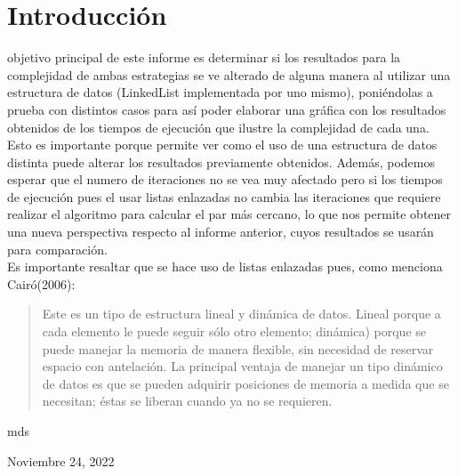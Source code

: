 \section{Introducción}
% 
% 
% 
% 
 objetivo principal de este informe es determinar si los resultados para la complejidad de ambas estrategias se ve alterado de alguna manera al utilizar una estructura de datos (LinkedList implementada por uno mismo), poniéndolas a prueba con distintos casos para así poder elaborar una gráfica con los resultados obtenidos de los tiempos de ejecución que ilustre la complejidad de cada una.\\

Esto es importante porque permite ver como el uso de una estructura de datos distinta puede alterar los resultados previamente obtenidos. Además, podemos esperar que el numero de iteraciones no se vea muy afectado pero si los tiempos de ejecución pues el usar listas enlazadas no cambia las iteraciones que requiere realizar el algoritmo para calcular el par más cercano, lo que nos permite obtener una nueva perspectiva respecto al informe anterior, cuyos resultados se usarán para comparación.\\

Es importante resaltar que se hace uso de listas enlazadas pues, como menciona Cairó(2006):\\
\begin{quote}
Este es un tipo de estructura lineal y dinámica de datos. Lineal porque a cada elemento le puede seguir sólo otro elemento; dinámica) porque se puede manejar la memoria de manera flexible, sin necesidad de reservar espacio con antelación.
La principal ventaja de manejar un tipo dinámico de datos es que se pueden adquirir posiciones de memoria a medida que se necesitan; éstas se liberan cuando ya no se requieren.    
\end{quote}



\hfill mds
 
\hfill Noviembre 24, 2022